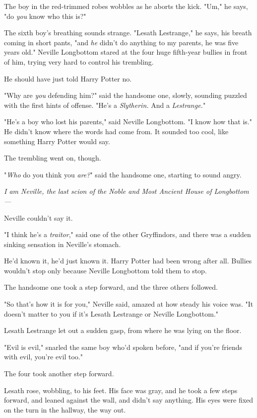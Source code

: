 The boy in the red-trimmed robes wobbles as he aborts the kick. "Um," he says,
"do \emph{you} know who this is?"

The sixth boy's breathing sounds strange. "Lesath Lestrange," he says, his
breath coming in short pants, "and \emph{he} didn't do anything to my parents,
he was five years old."
\sbreak
Neville Longbottom stared at the four huge fifth-year bullies in front of him,
trying very hard to control his trembling.

He should have just told Harry Potter no.

"Why are \emph{you} defending him?" said the handsome one, slowly, sounding
puzzled with the first hints of offense. "He's a \emph{Slytherin.} And a
\emph{Lestrange.}"

"He's a boy who lost his parents," said Neville Longbottom. "I know how that
is." He didn't know where the words had come from. It sounded too cool, like
something Harry Potter would say.

The trembling went on, though.

"\emph{Who} do you think you \emph{are?}" said the handsome one, starting to
sound angry.

\emph{I am Neville, the last scion of the Noble and Most Ancient House of
Longbottom---}

Neville couldn't say it.

"I think he's a \emph{traitor}," said one of the other Gryffindors, and there
was a sudden sinking sensation in Neville's stomach.

He'd known it, he'd just known it. Harry Potter had been wrong after all.
Bullies wouldn't stop only because Neville Longbottom told them to stop.

The handsome one took a step forward, and the three others followed.

"So that's how it is for you," Neville said, amazed at how steady his voice
was. "It doesn't matter to you if it's Lesath Lestrange or Neville Longbottom."

Lesath Lestrange let out a sudden gasp, from where he was lying on the floor.

"Evil is evil," snarled the same boy who'd spoken before, "and if you're
friends with evil, you're evil too."

The four took another step forward.

Lesath rose, wobbling, to his feet. His face was gray, and he took a few steps
forward, and leaned against the wall, and didn't say anything. His eyes were
fixed on the turn in the hallway, the way out.


